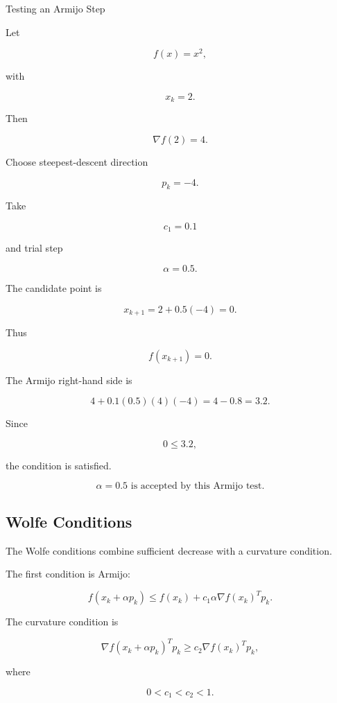 \begin{workedexamplebox}{Testing an Armijo Step}

Let

\[
f(x)=x^2,
\]

with

\[
x_k=2.
\]

Then

\[
\nabla f(2)=4.
\]

Choose steepest-descent direction

\[
p_k=-4.
\]

Take

\[
c_1=0.1
\]

and trial step

\[
\alpha=0.5.
\]

The candidate point is

\[
x_{k+1}
=
2+0.5(-4)
=
0.
\]

Thus

\[
f(x_{k+1})=0.
\]

The Armijo right-hand side is

\[
4
+
0.1(0.5)(4)(-4)
=
4-0.8
=
3.2.
\]

Since

\[
0\leq3.2,
\]

the condition is satisfied.

\begin{answerbox}
\[
\boxed{
\alpha=0.5
\text{ is accepted by this Armijo test.}
}
\]
\end{answerbox}

\end{workedexamplebox}

\subsection{Wolfe Conditions}
\label{subsec:wolfe-conditions}

The Wolfe conditions combine sufficient decrease with a curvature
condition.

The first condition is Armijo:

\[
f(x_k+\alpha p_k)
\leq
f(x_k)
+
c_1\alpha
\nabla f(x_k)^Tp_k.
\]

The curvature condition is

\[
\boxed{
\nabla f(x_k+\alpha p_k)^Tp_k
\geq
c_2
\nabla f(x_k)^Tp_k,
}
\]

where

\[
\boxed{
0<c_1<c_2<1.
}
\]

